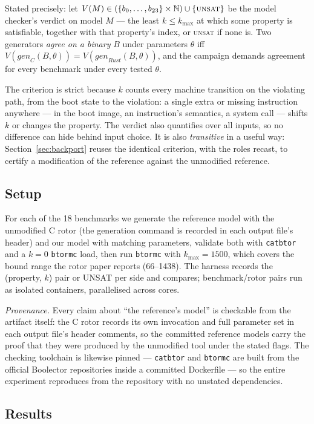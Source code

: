 \documentclass[sigplan,screen,nonacm]{acmart}
\begin{document}
Stated precisely: let $V(M) \in (\{b_0,\dots,b_{23}\} \times
\mathbb{N}) \cup \{\textsc{unsat}\}$ be the model checker's verdict on
model $M$ --- the least $k \le k_{\max}$ at which some property is
satisfiable, together with that property's index, or \textsc{unsat} if
none is. Two generators \emph{agree on a binary} $B$ under parameters
$\theta$ iff $V(\mathit{gen}_C(B,\theta)) =
V(\mathit{gen}_{\mathit{Rust}}(B,\theta))$, and the campaign demands
agreement for every benchmark under every tested $\theta$.

The criterion is strict because $k$ counts every machine transition on
the violating path, from the boot state to the violation: a single
extra or missing instruction anywhere --- in the boot image, an
instruction's semantics, a system call --- shifts $k$ or changes the
property. The verdict also quantifies over all inputs, so no difference
can hide behind input choice. It is also \emph{transitive} in a useful
way: Section~\ref{sec:backport} reuses the identical criterion, with
the roles recast, to certify a modification of the reference against
the unmodified reference.

\subsection{Setup}

For each of the 18 benchmarks we generate the reference model with the
unmodified C rotor (the generation command is recorded in each output
file's header) and our model with matching parameters, validate both
with \texttt{catbtor} and a $k{=}0$ \texttt{btormc} load, then run
\texttt{btormc} with $k_{\max} = 1500$, which covers the bound range the
rotor paper reports (66--1438). The harness records the (property, $k$)
pair or UNSAT per side and compares; benchmark/rotor pairs run as
isolated containers, parallelised across cores.

\emph{Provenance.} Every claim about ``the reference's model'' is
checkable from the artifact itself: the C rotor records its own
invocation and full parameter set in each output file's header
comments, so the committed reference models carry the proof that they
were produced by the unmodified tool under the stated flags. The
checking toolchain is likewise pinned --- \texttt{catbtor} and
\texttt{btormc} are built from the official Boolector repositories
inside a committed Dockerfile --- so the entire experiment reproduces
from the repository with no unstated dependencies.

\subsection{Results}
\end{document}
